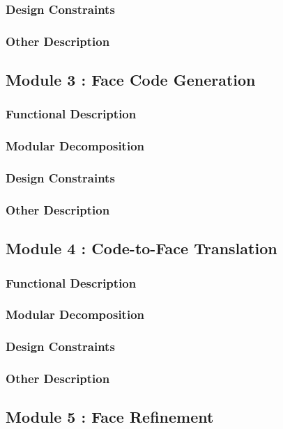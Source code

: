 \subsubsection{Design Constraints}
\subsubsection{Other Description}

\subsection{Module 3 : Face Code Generation}
\subsubsection{Functional Description}
\subsubsection{Modular Decomposition}
\subsubsection{Design Constraints}
\subsubsection{Other Description}

\subsection{Module 4 : Code-to-Face Translation}
\subsubsection{Functional Description}
\subsubsection{Modular Decomposition}
\subsubsection{Design Constraints}
\subsubsection{Other Description}

\subsection{Module 5 : Face Refinement}
